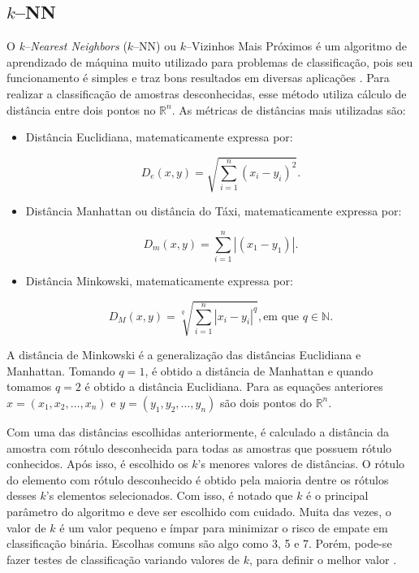 \subsection{$k$--NN}

O \textit{k--Nearest Neighbors} ($k$--NN) ou $k$--Vizinhos Mais Próximos é um algoritmo de aprendizado de máquina muito utilizado para problemas de classificação, pois seu funcionamento é simples e traz bons resultados em diversas aplicações \cite{knn2}. Para realizar a classificação de amostras desconhecidas, esse método utiliza cálculo de distância entre dois pontos no $\mathbb{R}^n$. As métricas de distâncias mais utilizadas são:

\begin{itemize}
	\item Distância Euclidiana, matematicamente expressa por:
	
	\begin{equation}
		D_e(x,y) = \sqrt{\sum_{i=1}^{n} (x_i - y_i)^2}.
		\label{eq:euclidiana}
	\end{equation}
	
	\item Distância Manhattan ou distância do Táxi, matematicamente expressa por:
	
	\begin{equation}
		D_m(x,y) = \sum_{i=1}^{n} |(x_1 - y_1)|.
		\label{eq:manhattan}
	\end{equation}
	
	\item Distância Minkowski, matematicamente expressa por:
	
	\begin{equation}
		D_M(x,y) = \sqrt[q]{\sum_{i=1}^{n} |x_i - y_i|^q}, \text{em que $q \in \mathbb{N}$}.
		\label{eq:minkowski}
	\end{equation}
\end{itemize}

A distância de Minkowski é a generalização das distâncias Euclidiana e Manhattan. Tomando $q = 1$, é obtido a distância de Manhattan e quando tomamos $q = 2$ é obtido a distância Euclidiana. Para as equações anteriores $x = (x_1, x_2, \dots, x_n)$ e $y = (y_1, y_2, \dots, y_n)$ são dois pontos do $\mathbb{R}^n$.

Com uma das distâncias escolhidas anteriormente, é calculado a distância da amostra com rótulo desconhecida para todas as amostras que possuem rótulo conhecidos. Após isso, é escolhido os $k$'s menores valores de distâncias. O rótulo do elemento com rótulo desconhecido é obtido pela maioria dentre os rótulos desses $k$'s elementos selecionados. Com isso, é notado que $k$ é o principal parâmetro do algoritmo e deve ser escolhido com cuidado. Muita das vezes, o valor de $k$ é um valor pequeno e ímpar para minimizar o risco de empate em classificação binária. Escolhas comuns são algo como 3, 5 e 7. Porém, pode-se fazer testes de classificação variando valores de $k$, para definir o melhor valor \cite{knn1}. 

